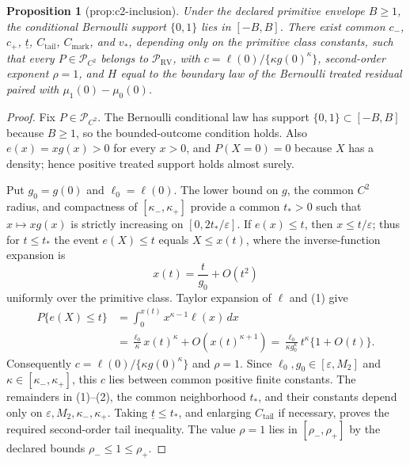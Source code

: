 \documentclass{article}
\newtheorem{proposition}{Proposition}
\begin{document}
\begin{proposition}[prop:c2-inclusion]\label{prop:c2-inclusion}
Under the declared primitive envelope \(B\geq1\), the conditional Bernoulli support \(\{0,1\}\) lies in \([-B,B]\). There exist common \(c_-\), \(c_+\), \(\underline t\), \(C_{\mathrm{tail}}\), \(C_{\mathrm{mark}}\), and \(v_*\), depending only on the primitive class constants, such that every \(P\in\mathcal P_{C^2}\) belongs to \(\mathcal P_{\mathrm{RV}}\), with \(c=\ell(0)/\{\kappa g(0)^\kappa\}\), second-order exponent \(\rho=1\), and \(H\) equal to the boundary law of the Bernoulli treated residual paired with \(\mu_1(0)-\mu_0(0)\).
\end{proposition}
\begin{proof}
Fix \(P\in\mathcal P_{C^2}\).  The Bernoulli conditional law has support \(\{0,1\}\subset[-B,B]\) because \(B\geq1\), so the bounded-outcome condition holds.  Also \(e(x)=xg(x)>0\) for every \(x>0\), and \(P(X=0)=0\) because \(X\) has a density; hence positive treated support holds almost surely.

Put \(g_0=g(0)\) and \(\ell_0=\ell(0)\).  The lower bound on \(g\), the common \(C^2\) radius, and compactness of \([\kappa_-,\kappa_+]\) provide a common \(t_*>0\) such that \(x\mapsto xg(x)\) is strictly increasing on \([0,2t_*/\varepsilon]\).  If \(e(x)\leq t\), then \(x\leq t/\varepsilon\); thus for \(t\leq t_*\) the event \(e(X)\leq t\) equals \(X\leq x(t)\), where the inverse-function expansion is
\[
 x(t)=\frac{t}{g_0}+O(t^2) \tag{1}
\]
uniformly over the primitive class.  Taylor expansion of \(\ell\) and (1) give
\[
\begin{split}
 P\{e(X)\leq t\}
 &=\int_0^{x(t)}x^{\kappa-1}\ell(x)\,dx\\
 &=\frac{\ell_0}{\kappa}x(t)^\kappa+O(x(t)^{\kappa+1})
 =\frac{\ell_0}{\kappa g_0^\kappa}t^\kappa\{1+O(t)\}.
\end{split} \tag{2}
\]
Consequently \(c=\ell(0)/\{\kappa g(0)^\kappa\}\) and \(\rho=1\).  Since \(\ell_0,g_0\in[\varepsilon,M_2]\) and \(\kappa\in[\kappa_-,\kappa_+]\), this \(c\) lies between common positive finite constants.  The remainders in (1)--(2), the common neighborhood \(t_*\), and their constants depend only on \(\varepsilon,M_2,\kappa_-,\kappa_+\).  Taking \(\underline t\leq t_*\), and enlarging \(C_{\mathrm{tail}}\) if necessary, proves the required second-order tail inequality.  The value \(\rho=1\) lies in \([\rho_-,\rho_+]\) by the declared bounds \(\rho_-\leq1\leq\rho_+\).


\end{proof}
\end{document}
